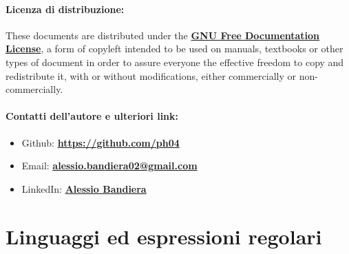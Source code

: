 \documentclass[a4paper, 12pt]{report}
\begin{document}
    \quad

    \subsubsection{Licenza di distribuzione:}
    
    These documents are distributed under the \textbf{\href{https://www.gnu.org/licenses/fdl-1.3.txt}{GNU Free Documentation License}}, a form of copyleft intended to be used on manuals, textbooks or other types of document in order to assure everyone the effective freedom to copy and redistribute it, with or without modifications, either commercially or non-commercially.
    
    \quad

    \subsubsection{Contatti dell'autore e ulteriori link:}
    \begin{itemize}


        \item Github: \textbf{\href{https://github.com/ph04}{https://github.com/ph04}}
        \item Email: \textbf{\href{mailto:alessio.bandiera02@gmail.com}{alessio.bandiera02@gmail.com}}
        \item LinkedIn: \textbf{\href{https://www.linkedin.com/in/alessio-bandiera-a53767223/}{Alessio Bandiera}}
    \end{itemize}


    \chapter{Linguaggi ed espressioni regolari}
\end{document}
